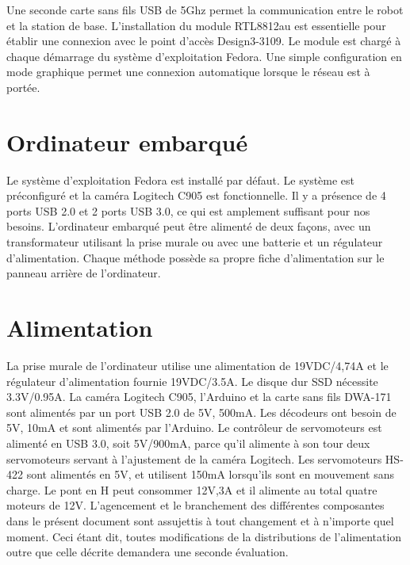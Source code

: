  Une seconde carte sans fils USB de 5Ghz permet la communication entre le robot et la station de base. L'installation du module RTL8812au est essentielle pour établir
 une connexion avec le point d'accès Design3-3109. Le module est chargé à chaque démarrage du système d'exploitation Fedora. Une simple configuration en mode graphique
 permet une connexion automatique lorsque le réseau est à portée.

\section{Ordinateur embarqué}
Le système d'exploitation Fedora est installé par défaut. Le système est préconfiguré et la caméra Logitech C905 est fonctionnelle.  Il y a présence de 4 ports USB 2.0 et 2 ports USB 3.0,
ce qui est amplement suffisant pour nos besoins. L'ordinateur embarqué peut être alimenté de deux façons, avec un transformateur utilisant la prise murale ou avec une batterie et un régulateur d'alimentation.
Chaque méthode possède sa propre fiche d'alimentation sur le panneau arrière de l'ordinateur.


\section{Alimentation}
   La prise murale de l'ordinateur utilise une alimentation de 19VDC/4,74A et le régulateur d'alimentation fournie 19VDC/3.5A. Le disque dur SSD nécessite 3.3V/0.95A. La caméra Logitech C905,
   l'Arduino et la carte sans fils DWA-171 sont alimentés par un port USB 2.0 de 5V, 500mA. Les décodeurs ont besoin de 5V, 10mA et sont alimentés par l'Arduino. Le contrôleur de servomoteurs
   est alimenté en USB 3.0, soit 5V/900mA, parce qu'il alimente à son tour deux servomoteurs servant à l'ajustement de la caméra Logitech. Les servomoteurs HS-422 sont alimentés en 5V,
   et utilisent 150mA lorsqu'ils sont en mouvement sans charge. Le pont en H peut consommer 12V,3A et il alimente au total quatre moteurs de 12V. L'agencement et le branchement des différentes
   composantes dans le présent document sont assujettis à tout changement et à n'importe quel moment. Ceci étant dit, toutes modifications de la distributions de l'alimentation outre que celle
   décrite demandera une seconde évaluation.

